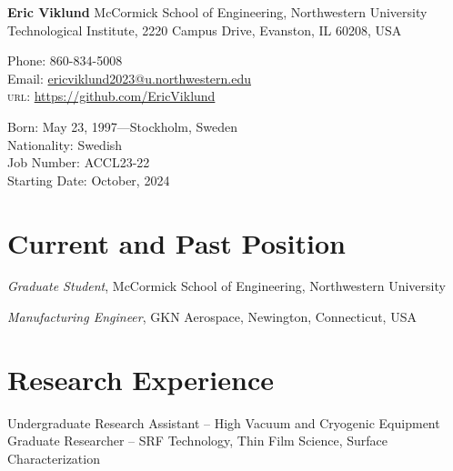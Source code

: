 \documentclass[11pt]{article} %
\begin{document}

{\LARGE\bfseries Eric Viklund} %
\bigskip\medskip %
McCormick School of Engineering,  Northwestern University\\ %
Technological Institute, 2220 Campus Drive, Evanston, IL 60208, USA
\medskip %

Phone: 860-834-5008\\ %
Email: \href{mailto:ericviklund2023@u.northwestern.edu}{ericviklund2023@u.northwestern.edu}\\ %
\textsc{url}: \href{https://github.com/EricViklund}{https://github.com/EricViklund} %

\medskip  %


Born: May 23, 1997---Stockholm, Sweden\\ %
Nationality: Swedish\\ %
Job Number: ACCL23-22\\
Starting Date: October, 2024


\section*{Current and Past Position}

\emph{Graduate Student}, McCormick School of Engineering,  Northwestern University %


\emph{Manufacturing Engineer}, GKN Aerospace, Newington, Connecticut, USA


\section*{Research Experience}

Undergraduate Research Assistant -- High Vacuum and Cryogenic Equipment\\
Graduate Researcher -- SRF Technology, Thin Film Science, Surface Characterization 
\end{document}
